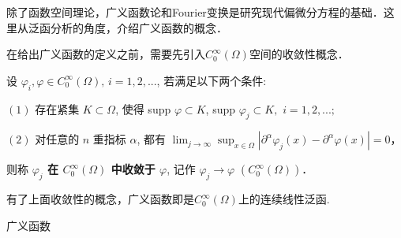 
除了函数空间理论，广义函数论和Fourier变换是研究现代偏微分方程的基础．这里从泛函分析的角度，介绍广义函数的概念．

在给出广义函数的定义之前，需要先引入$C_0^\infty(\Omega)$空间的收敛性概念．

\begin{definition}{}
设 $\varphi_i,\varphi\in C_0^\infty(\Omega),\,i=1,2,...$,  若满足以下两个条件:

$(1)$ 存在紧集 $K\subset\Omega$, 使得 supp $\varphi\subset K$, supp $\varphi_{j}\subset K,$
$i=1,2,...;$ 

$(2)$ 对任意的 $n$ 重指标 $\alpha$, 都有 ${\displaystyle \lim_{j\rightarrow\infty}{\displaystyle \sup_{x\in\Omega}\left|\partial^{\alpha}\varphi_{j}(x)-\partial^{\alpha}\varphi(x)\right|=0}}$，


则称\textbf{ \textbf{$\varphi_{j}$ 在 $C_{0}^{\infty}(\Omega)$ 中收敛于 $\varphi$}}, 记作 
$\varphi_{j}\rightarrow\varphi$ $(C_{0}^{\infty}(\Omega))$．

\end{definition}

有了上面收敛性的概念，广义函数即是$C_0^\infty(\Omega)$上的连续线性泛函.

\begin{definition}{广义函数}

\end{definition}